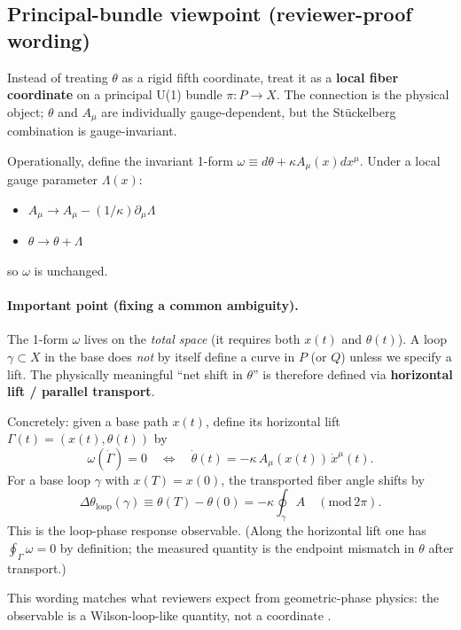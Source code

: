 ﻿\documentclass[twocolumn,aps,prd,nofootinbib]{revtex4-2}
\begin{document}
\subsection{Principal-bundle viewpoint (reviewer-proof wording)}
Instead of treating $\theta$ as a rigid fifth coordinate, treat it as a \textbf{local fiber coordinate} on a principal U(1) bundle $\pi:P\to X$. The connection is the physical object; $\theta$ and $A_\mu$ are individually gauge-dependent, but the St\"uckelberg combination is gauge-invariant.

Operationally, define the invariant 1-form $\omega \equiv d\theta + \kappa A_\mu(x) dx^\mu$. Under a local gauge parameter $\Lambda(x)$:
\begin{itemize}
    \item $A_\mu \to A_\mu - (1/\kappa) \partial_\mu\Lambda$
    \item $\theta \to \theta + \Lambda$
\end{itemize}
so $\omega$ is unchanged.

\paragraph{Important point (fixing a common ambiguity).}
The 1-form $\omega$ lives on the \emph{total space} (it requires both $x(t)$ and $\theta(t)$). A loop $\gamma\subset X$ in the base does \emph{not} by itself define a curve in $P$ (or $Q$) unless we specify a lift. The physically meaningful ``net shift in $\theta$'' is therefore defined via \textbf{horizontal lift / parallel transport}.

Concretely: given a base path $x(t)$, define its horizontal lift $\Gamma(t)=(x(t),\theta(t))$ by
\begin{equation}
\omega(\dot{\Gamma})=0\quad\Longleftrightarrow\quad \dot\theta(t)=-\kappa\,A_\mu(x(t))\,\dot x^\mu(t).
\end{equation}
For a base loop $\gamma$ with $x(T)=x(0)$, the transported fiber angle shifts by
\begin{equation}
\Delta\theta_{\mathrm{loop}}(\gamma)\equiv \theta(T)-\theta(0)= -\kappa\oint_\gamma A\quad(\mathrm{mod}\,2\pi).
\end{equation}
This is the loop-phase response observable. (Along the horizontal lift one has $\oint_\Gamma \omega=0$ by definition; the measured quantity is the endpoint mismatch in $\theta$ after transport.)

This wording matches what reviewers expect from geometric-phase physics: the observable is a Wilson-loop-like quantity, not a coordinate \cite{Wilson1974,Nakahara2003}.
\end{document}
